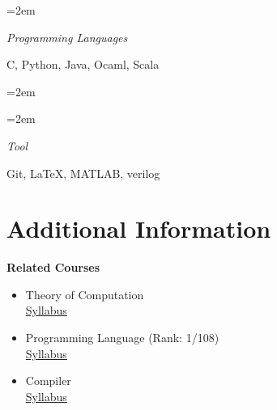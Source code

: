 \documentclass[paper=a4,fontsize=11pt]{scrartcl} %
\newlength{\spacebox}
\newcommand{\NewPart}[1]{\section*{{#1}}}
\newcommand{\PersonalEntry}[2]{
		\noindent\hangindent=2em\hangafter=0 %
		\parbox{\spacebox}{        %
		\textit{#1}}		       %
		\hspace{1.5em} #2 \par}    %
\newcommand{\SkillsEntry}[2]{      %
		\noindent\hangindent=2em\hangafter=0 %
		\parbox{\spacebox}{        %
		\textit{#1}}			   %
		\hspace{1.5em} #2 \par}    %
\newcommand{\EducationEntry}[4]{
		\noindent \textbf{#1} \hfill      %
		\colorbox{White}{%
			\parbox{5cm}{%
			\hfill\color{Black}#2}} \par  %
		\noindent #3 \par        %
		\noindent\small #4 %
		\normalsize \par}
\begin{document}
\SkillsEntry{Programming Languages}{C, Python, Java, Ocaml, Scala}
\SkillsEntry{}{}
\SkillsEntry{Tool}{Git, \LaTeX, MATLAB, verilog}


\NewPart{Additional Information}{}

\EducationEntry{Related Courses}{}{
	\begin{itemize}
		\item Theory of Computation \\
		      \href{http://prl.korea.ac.kr/~pronto/home/courses/cose215/2019/slides/lec0.pdf}{Syllabus}
		\item Programming Language (Rank: 1/108) \\
		      \href{http://prl.korea.ac.kr/~pronto/home/courses/cose212/2019/syllabus.pdf}{Syllabus}
		\item Compiler \\
		      \href{http://prl.korea.ac.kr/~pronto/home/courses/cose312/2017/slides/lec0.pdf}{Syllabus}
	\end{itemize}
}{}


\end{document}
